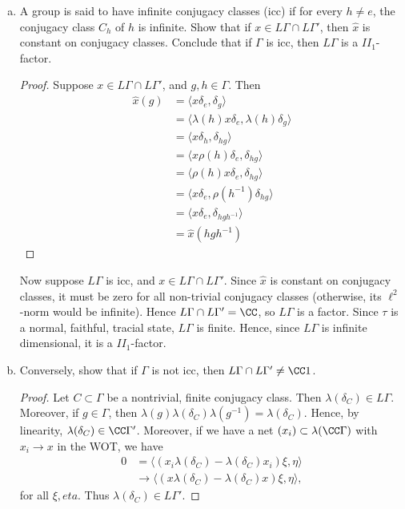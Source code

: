\documentclass{article}
\begin{document}
\begin{enumerate}[(a)]
\begin{proof}
  \end{proof}
\item A group is said to have infinite conjugacy classes (icc) if for every $h \neq e$, the conjugacy class $C_h$ of $h$ is infinite. Show that if $x \in L \Gamma \cap L \Gamma'$, then $\hat{x}$ is constant on conjugacy classes. Conclude that if $\Gamma$ is icc, then $L\Gamma$ is a $II_1$-factor.
  \begin{proof}
    Suppose $x \in L\Gamma \cap L\Gamma'$, and $g,h \in \Gamma$.  Then
    \begin{align*}
    \hat{x}(g) & = \langle x \delta_e , \delta_g \rangle \\
    & = \langle \lambda(h) x \delta_e , \lambda(h) \delta_g \rangle \\
    & = \langle x \delta_h , \delta_{hg} \rangle \\
    & = \langle x \rho(h) \delta_{e}, \delta_{hg} \rangle \\
    & = \langle \rho(h) x \delta_{e}, \delta_{hg} \rangle \\
    & = \langle x \delta_{e}, \rho(h^{-1}) \delta_{hg} \rangle \\
    & = \langle x \delta_{e},  \delta_{hgh^{-1}} \rangle \\
    & = \hat{x}(hgh^{-1})
    \end{align*}
  \end{proof}

  Now suppose $L \Gamma$ is icc, and $x \in L \Gamma \cap L \Gamma'$.  Since $\hat{x}$ is constant on conjugacy classes, it must be zero for all non-trivial conjugacy classes (otherwise, its $\ell^2$-norm would be infinite).  Hence $L \Gamma \cap L \Gamma' = \CC$, so $L \Gamma$ is a factor. Since $\tau$ is a normal, faithful, tracial state, $L \Gamma$ is finite. Hence, since $L \Gamma$ is infinite dimensional, it is a $II_1$-factor.
  
\item Conversely, show that if $\Gamma$ is not icc, then $L\Gamma \cap L\Gamma' \neq \CC 1$.
  \begin{proof}
    Let $C \subset \Gamma$ be a nontrivial, finite conjugacy class.  Then $\lambda(\delta_C) \in L\Gamma$.  Moreover, if $g \in \Gamma$, then $\lambda(g) \lambda(\delta_C) \lambda(g^{-1}) = \lambda(\delta_C)$.  Hence, by linearity, $\lambda(\delta_C) \in \CC \Gamma'$.  Moreover, if we have a net $(x_i) \subset \lambda(\CC \Gamma)$ with $x_i \to x$ in the WOT, we have
    \begin{align*}
      0 & = \langle (x_i \lambda(\delta_C) - \lambda(\delta_C) x_i) \xi, \eta \rangle \\
      & \to  \langle (x \lambda(\delta_C)  -  \lambda(\delta_C) x )\xi, \eta \rangle,
    \end{align*}
    for all $\xi, eta$.  Thus $\lambda(\delta_C) \in L\Gamma'$.
  \end{proof}
\end{enumerate}
\end{document}
